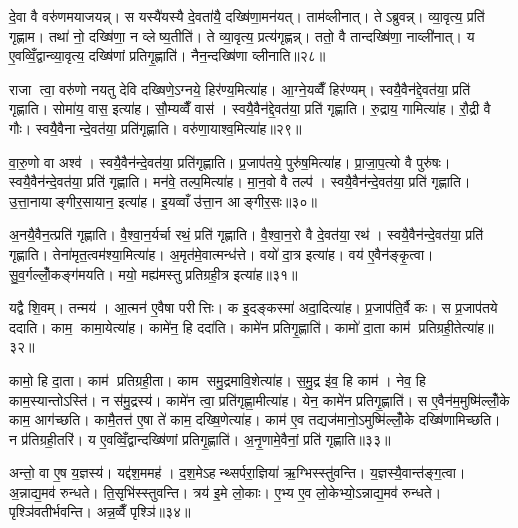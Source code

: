 दे॒वा वै वरु॑णमयाजयन्न्। स यस्यै॑यस्यै दे॒वता॑यै॒ दख्षि॑णा॒मन॑यत्। ताम॑व्लीनात्। तेऽब्रुवन्न्। व्या॒वृत्य॒ प्रति॑ गृह्णाम। तथा॑ नो॒ दख्षि॑णा॒ न व्लेष्य॒तीति॑। ते व्या॒वृत्य॒ प्रत्य॑गृह्णन्न्। ततो॒ वै तान्दख्षि॑णा॒ नाव्ली॑नात्। य ए॒वव्विँ॒द्वान्व्या॒वृत्य॒ दख्षि॑णां प्रतिगृ॒ह्णाति॑। नैन॒न्दख्षि॑णा व्लीनाति॥२८॥

राजा त्वा॒ वरु॑णो नयतु देवि दख्षिणे॒ऽग्नये॒ हिर॑ण्य॒मित्या॑ह। आ॒ग्ने॒यव्वैँ हिर॑ण्यम्। स्वयै॒वैन॑द्दे॒वत॑या॒ प्रति॑ गृह्णाति। सोमा॑य॒ वास॒ इत्या॑ह। सौ॒म्यव्वैँ वास॑। स्वयै॒वैन॑द्दे॒वत॑या॒ प्रति॑ गृह्णाति। रु॒द्राय॒ गामित्या॑ह। रौ॒द्री वै गौः। स्वयै॒वैनान्दे॒वत॑या॒ प्रति॑गृह्णाति। वरु॑णा॒याश्व॒मित्या॑ह॥२९॥

वा॒रु॒णो वा अश्व॑। स्वयै॒वैन॑न्दे॒वत॑या॒ प्रति॑गृह्णाति। प्र॒जाप॑तये॒ पुरु॑ष॒मित्या॑ह। प्रा॒जा॒प॒त्यो वै पुरु॑षः। स्वयै॒वैन॑न्दे॒वत॑या॒ प्रति॑ गृह्णाति। मन॑वे॒ तल्प॒मित्या॑ह। मा॒न॒वो वै तल्प॑। स्वयै॒वैन॑न्दे॒वत॑या॒ प्रति॑ गृह्णाति। उ॒त्ता॒नायाङ्गीर॒सायान॒ इत्या॑ह। इ॒यव्वाँ उ॑त्ता॒न आङ्गीर॒सः॥३०॥

अ॒नयै॒वैन॒त्प्रति॑ गृह्णाति। वै॒श्वा॒न॒र्यर्चा रथं॒ प्रति॑ गृह्णाति। वै॒श्वा॒न॒रो वै दे॒वत॑या॒ रथ॑। स्वयै॒वैन॑न्दे॒वत॑या॒ प्रति॑ गृह्णाति। तेना॑मृत॒त्वम॑श्या॒मित्या॑ह। अ॒मृत॑मे॒वात्मन्ध॑त्ते। वयो॑ दा॒त्र इत्या॑ह। वय॑ ए॒वैन॑ङ्कृ॒त्वा। सु॒व॒र्गल्लोँ॒कङ्ग॑मयति। मयो॒ मह्य॑मस्तु प्रतिग्रही॒त्र इत्या॑ह॥३१॥

यद्वै शि॒वम्। तन्मय॑। आ॒त्मन॑ ए॒वैषा परीत्तिः। क इ॒दङ्कस्मा॑ अदा॒दित्या॑ह। प्र॒जाप॑ति॒र्वै कः। स प्र॒जाप॑तये ददाति। काम॒ कामा॒येत्या॑ह। कामे॑न॒ हि ददा॑ति। कामे॑न प्रतिगृ॒ह्णाति॑। कामो॑ दा॒ता काम॑ प्रतिग्रही॒तेत्या॑ह॥३२॥

कामो॒ हि दा॒ता। काम॑ प्रतिग्रही॒ता। काम समु॒द्रमावि॒शेत्या॑ह। स॒मु॒द्र इ॑व॒ हि काम॑। नेव॒ हि काम॒स्यान्तोऽस्ति॑। न स॑मु॒द्रस्य॑। कामे॑न त्वा॒ प्रति॑गृह्णा॒मीत्या॑ह। येन॒ कामे॑न प्रतिगृ॒ह्णाति॑। स ए॒वैन॑म॒मुष्मि॑ल्लोँ॒के काम॒ आग॑च्छति। कामै॒तत्त॑ ए॒षा ते॑ काम॒ दख्षि॒णेत्या॑ह। काम॑ ए॒व तद्यज॑मानो॒ऽमुष्मि॑ल्लोँ॒के दख्षि॑णामिच्छति। न प्र॑तिग्रही॒तरि॑। य ए॒वव्विँ॒द्वान्दख्षि॑णां प्रतिगृ॒ह्णाति॑। अ॒नृ॒णामे॒वैनां॒ प्रति॑ गृह्णाति॥३३॥\anuvakamend[व्ली॒ना॒त्यश्व॒मित्या॑हाङ्गीर॒सः प्र॑तिग्रही॒त्र इत्या॑ह प्रतिग्रही॒तेत्या॑ह॒ दख्षि॒णेत्या॑ह च॒त्वारि॑ च]

अन्तो॒ वा ए॒ष य॒ज्ञस्य॑। यद्द॑श॒ममह॑। द॒श॒मेऽहन्थ्सर्परा॒ज्ञिया॑ ऋ॒ग्भिस्स्तु॑वन्ति। य॒ज्ञस्यै॒वान्त॑ङ्ग॒त्वा। अ॒न्नाद्य॒मव॑ रुन्धते। ति॒सृभि॑स्स्तुवन्ति। त्रय॑ इ॒मे लो॒काः। ए॒भ्य ए॒व लो॒केभ्यो॒ऽन्नाद्य॒मव॑ रुन्धते। पृश्ञि॑वतीर्भवन्ति। अन्न॒व्वैँ पृश्ञि॑॥३४॥

